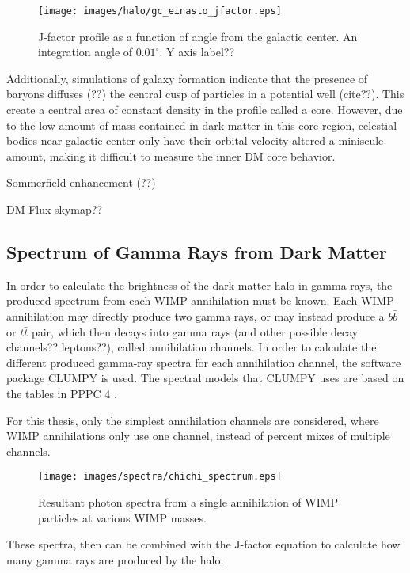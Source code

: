     \begin{figure}[ht]
    \centering
      \texttt{[image: images/halo/gc\_einasto\_jfactor.eps]}
      \caption[Galactic Center Einasto Halo Jfactor]{
        J-factor profile as a function of angle from the galactic center.
        An integration angle of ${0.01}^{\circ}$.
        {\color{red}Y axis label??}
      }
      \label{fig:gchalo_jfactor}
    \end{figure}
    
    Additionally, simulations of galaxy formation indicate that the presence of baryons diffuses {\color{red}(??)} the central cusp of particles in a potential well {\color{red}(cite??)}.
    This create a central area of constant density in the profile called a core.
    However, due to the low amount of mass contained in dark matter in this core region, celestial bodies near galactic center only have their orbital velocity altered a miniscule amount, making it difficult to measure the inner DM core behavior.

    {\color{red}Sommerfield enhancement (??)}

    
    {\color{red}DM Flux skymap??}
    
  \subsection{Spectrum of Gamma Rays from Dark Matter}\label{dm_spectral}
    In order to calculate the brightness of the dark matter halo in gamma rays, the produced spectrum from each WIMP annihilation must be known.
    Each WIMP annihilation may directly produce two gamma rays, or may instead produce a $b\bar{b}$  or $t\bar{t}$ pair, which then decays into gamma rays {\color{red}(and other possible decay channels?? leptons??)}, called annihilation channels.
    In order to calculate the different produced gamma-ray spectra for each annihilation channel, the software package CLUMPY \cite{CLUMPYcode} is used.
    The spectral models that CLUMPY uses are based on the tables in PPPC 4 \cite{pppc4_dm_spectra}.

    For this thesis, only the simplest annihilation channels are considered, where WIMP annihilations only use one channel, instead of percent mixes of multiple channels.

    \begin{figure}[ht]
      \centering
      \texttt{[image: images/spectra/chichi\_spectrum.eps]}
      \caption[Single Annihilation Spectra]{
        Resultant photon spectra from a single annihilation of WIMP particles at various WIMP masses.}
      \label{fig:chichi_spectrum}
    \end{figure}

    These spectra, then can be combined with the J-factor equation to calculate how many gamma rays are produced by the halo.

    
    
